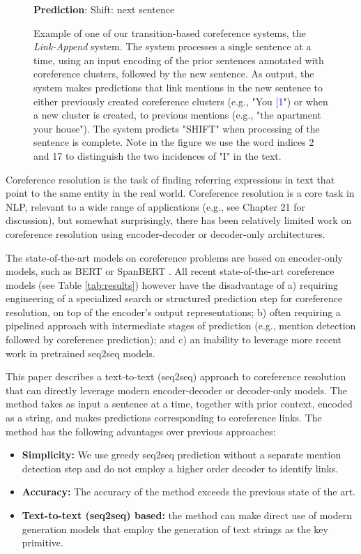 \documentclass[11pt,a4paper]{article}
\newcommand{\LA}{Link-Append}
\begin{document}
\begin{figure}[ht!]
{\begin{tcolorbox}[colback=blue!1, outer arc=0mm, left=0mm,right=0mm,top=0mm,bottom=0mm]
{\bf Prediction}: {\sc Shift}: next sentence
\end{tcolorbox} 
}
 
\caption{ Example of one of our transition-based coreference systems, the {\em \LA} system. The system processes a single sentence at a time, using an input encoding of the prior sentences annotated with coreference clusters, followed by the new sentence. As output, the system makes predictions that link mentions in the new sentence to either previously created coreference clusters (e.g., "You  \textcolor{blue}{[1}") or when a new cluster is created, to previous mentions (e.g., "the apartment   your house"). The system predicts "SHIFT" when processing of the sentence is complete. Note in the figure we use the word indices 2 and 17 to distinguish the two incidences of "I" in the text.
}
    \label{fig:example_introduction}
\end{figure}


Coreference resolution is the task of finding referring expressions in text that point to the same entity in the real world. Coreference resolution is a core task in NLP, relevant to a wide range of applications (e.g., see  Chapter 21 for discussion), but somewhat surprisingly, there has been relatively limited work on coreference resolution using encoder-decoder or decoder-only architectures. 

The state-of-the-art models on coreference problems are based on encoder-only models, such as BERT \cite{devlin-etal-2019-bert} or
SpanBERT \cite{joshi-etal-2020-spanbert}.
All recent state-of-the-art coreference models (see Table \ref{tab:results}) however have the disadvantage of
a) requiring engineering of a specialized search or structured prediction step for coreference resolution, on top of the encoder's output representations; b) often requiring a pipelined approach with intermediate stages of prediction (e.g., mention detection followed by coreference prediction); and c) an inability to leverage more recent work in pretrained seq2seq models.

This paper describes a text-to-text (seq2seq) approach to coreference resolution that can directly leverage modern encoder-decoder or decoder-only models. The method takes as input a sentence at a time, together with prior context, encoded as a string, and makes predictions corresponding to coreference links. The method has the following advantages over previous approaches: 


\begin{itemize}
    \item {\bf Simplicity:} We use greedy seq2seq prediction without a separate mention detection step and do not employ a higher order decoder to identify links. 

    \item {\bf Accuracy:} The accuracy of the method exceeds the previous state of the art. 
    \item {\bf Text-to-text (seq2seq) based:} the method can make direct use of modern generation models that employ the generation of text strings as the key primitive.
\end{itemize}
\end{document}
